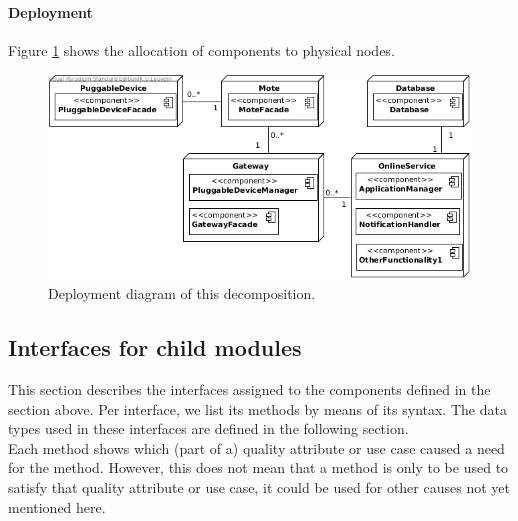 
    \paragraph{Deployment}
        Figure \ref{fig:it1-depl_main} shows the allocation of components
        to physical nodes.

        \begin{figure}[!htp]
        	\centering
        	\includegraphics[width=1.00\textwidth]{deployment-diagram-1}
        	\caption{Deployment diagram of this decomposition.}\label{fig:it1-depl_main}
        \end{figure}


\subsection{Interfaces for child modules}\label{add1-interfaces}
    This section describes the interfaces assigned to the components defined
    in the section above. Per interface, we list its methods by means of its
    syntax. The data types used in these interfaces are defined in the following section. \\

    \noindent Each method shows which (part of a) quality attribute or use case caused
    a need for the method. However, this does not mean that a method is
    only to be used to satisfy that quality attribute or use case, it could
    be used for other causes not yet mentioned here.

